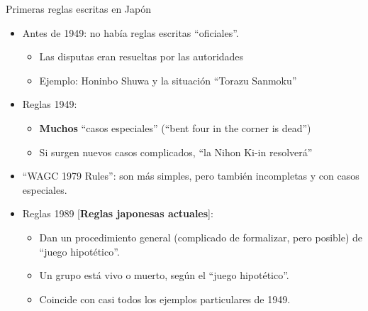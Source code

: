 \documentclass{beamer}
\begin{document}
\begin{frame}{Primeras reglas escritas en Japón}
  
  \begin{itemize}
    \item Antes de 1949: no había reglas escritas ``oficiales''. 
       \begin{itemize}
         \item Las disputas eran resueltas por las autoridades
         \item Ejemplo: Honinbo Shuwa y la situación ``Torazu Sanmoku''
       \end{itemize}
    \item Reglas 1949:
    \begin{itemize}
        \item \textbf{Muchos} ``casos especiales'' (``bent four in the corner is dead'')
        \item Si surgen nuevos casos complicados, ``la Nihon Ki-in resolverá''
    \end{itemize}
    \item ``WAGC 1979 Rules'': son más simples, pero también incompletas y con casos especiales. 
    \item Reglas 1989 [\textbf{Reglas japonesas actuales}]:
     \begin{itemize}
        \item Dan un procedimiento general (complicado de formalizar, pero posible) de ``juego hipotético''.
        \item Un grupo está vivo o muerto, según el ``juego hipotético''.
        \item Coincide con casi todos los ejemplos particulares de 1949.
     \end{itemize} 
    
  \end{itemize}
  
\end{frame}

%  
%    
%  
\end{document}
